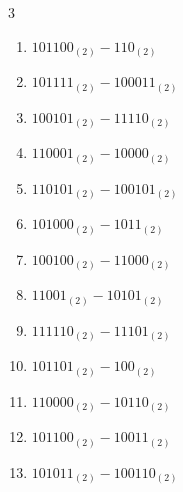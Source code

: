 \begin{multicols}{3}
\begin{enumerate}
\columnbreak %

  \item $101100_{(2)} - 110_{(2)}$


  \item $101111_{(2)} - 100011_{(2)}$


  \item $100101_{(2)} - 11110_{(2)}$


  \item $110001_{(2)} - 10000_{(2)}$


  \item $110101_{(2)} - 100101_{(2)}$


  \item $101000_{(2)} - 1011_{(2)}$


  \item $100100_{(2)} - 11000_{(2)}$


  \item $11001_{(2)} - 10101_{(2)}$


  \item $111110_{(2)} - 11101_{(2)}$


  \item $101101_{(2)} - 100_{(2)}$


\columnbreak %

\resetques

  \item $110000_{(2)} - 10110_{(2)}$


  \item $101100_{(2)} - 10011_{(2)}$


  \item $101011_{(2)} - 100110_{(2)}$



\end{enumerate}
\end{multicols}
